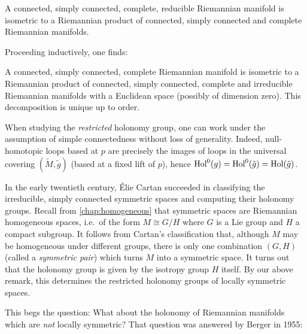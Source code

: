 \begin{thm}
	A connected, simply connected, complete, reducible Riemannian manifold is isometric to a Riemannian product of connected, simply connected and complete Riemannian manifolds.
\end{thm}

Proceeding inductively, one finds:

\begin{thm}
	A connected, simply connected, complete Riemannian manifold is isometric to a Riemannian product of connected, simply connected, complete and irreducible Riemannian manifolds with a Euclidean space (possibly of dimension zero). This decomposition is unique up to order.
\end{thm}

When studying the \emph{restricted} holonomy group, one can work under the assumption of simple connectedness without loss of generality. Indeed, null-homotopic loops based at $p$ are precisely the images of loops in the universal covering $(\tilde M,\tilde g)$ (based at a fixed lift of $p$), hence $\operatorname{Hol}^0(g)=\operatorname{Hol}^0(\tilde g)=\operatorname{Hol}(\tilde g)$.

In the early twentieth century, \'Elie Cartan succeeded in classifying the irreducible, simply connected symmetric spaces and computing their holonomy groups. Recall from \cref{chap:homogeneous} that symmetric spaces are Riemannian homogeneous spaces, i.e.~of the form $M\cong G/H$ where $G$ is a Lie group and $H$ a compact subgroup. It follows from Cartan's classification that, although $M$ may be homogeneous under different groups, there is only one combination $(G,H)$ (called a \emph{symmetric pair}) which turns $M$ into a symmetric space. It turns out that the holonomy group is given by the isotropy group $H$ itself. By our above remark, this determines the restricted holonomy groups of locally symmetric spaces. 

This begs the question: What about the holonomy of Riemannian manifolds which are \emph{not} locally symmetric? That question was answered by Berger in 1955:

